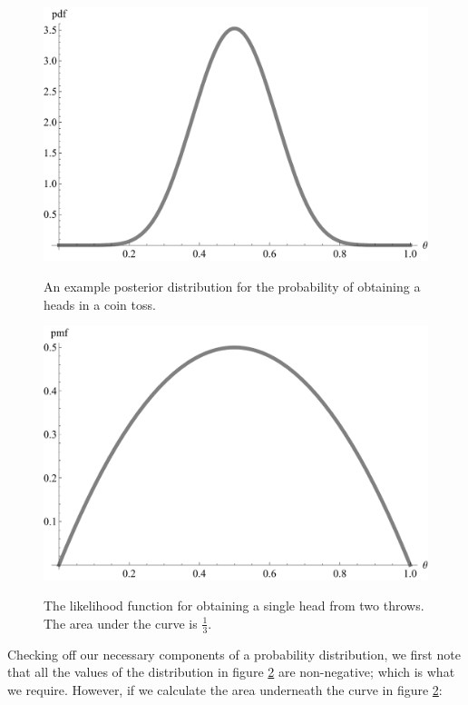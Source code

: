 \documentclass[11pt,fullpage]{book}
\begin{document}
\begin{figure}
\centering
\scalebox{0.5} 
{\includegraphics{Likelihood_posteriorExample.pdf}}
\caption{An example posterior distribution for the probability of obtaining a heads in a coin toss.}\label{fig:Likelihood_posteriorExample}
\end{figure}

\begin{figure}
\centering
\scalebox{0.5} 
{\includegraphics{Likelihood_coinLikelihood.pdf}}
\caption{The likelihood function for obtaining a single head from two throws. The area under the curve is $\frac{1}{3}$.}\label{fig:Likelihood_coinLikelihood}
\end{figure}

Checking off our necessary components of a probability distribution, we first note that all the values of the distribution in figure \ref{fig:Likelihood_coinLikelihood} are non-negative; which is what we require. However, if we calculate the area underneath the curve in figure \ref{fig:Likelihood_coinLikelihood}:
\end{document}
